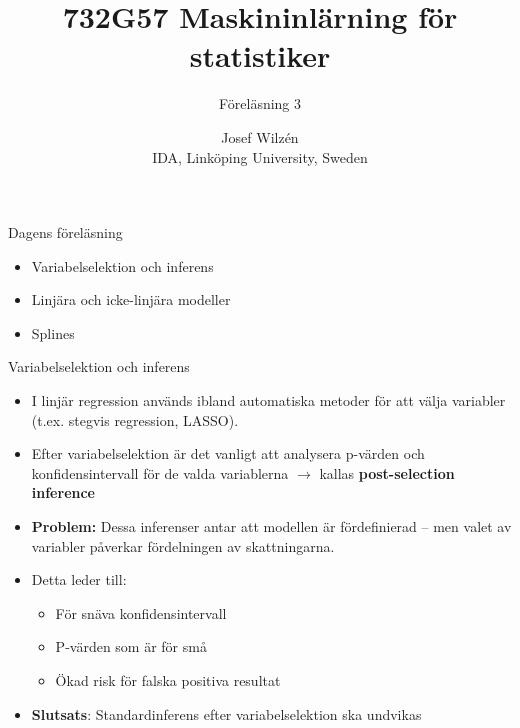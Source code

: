 \documentclass[10pt,english]{beamer}
\title{732G57 Maskininlärning för statistiker }
\subtitle{Föreläsning 3}
\date{}
\author{Josef Wilzén \\ IDA, Linköping University, Sweden}
\begin{document}
\maketitle

\begin{frame}{Dagens föreläsning}

    \begin{itemize}
        \item Variabelselektion och inferens
        \item Linjära och icke-linjära modeller
        \item Splines
    \end{itemize}
    
\end{frame}


\begin{frame}{Variabelselektion och inferens}
\begin{itemize}
    \item I linjär regression används ibland automatiska metoder för att välja variabler (t.ex. stegvis regression, LASSO).
    \item Efter variabelselektion är det vanligt att analysera p-värden och konfidensintervall för de valda variablerna $\rightarrow$ kallas \textbf{post-selection inference}
    \item \textbf{Problem:} Dessa inferenser antar att modellen är fördefinierad – men valet av variabler påverkar fördelningen av skattningarna.
    \item Detta leder till:
    \begin{itemize}
        \item För snäva konfidensintervall
        \item P-värden som är för små
        \item Ökad risk för falska positiva resultat
    \end{itemize}
    \item \textbf{Slutsats}: Standardinferens efter variabelselektion ska undvikas
\end{itemize}
\end{frame}
\end{document}
